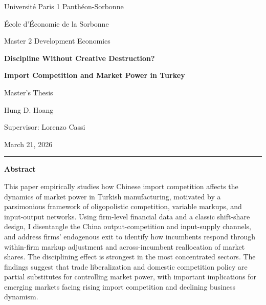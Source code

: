 \documentclass[12pt]{article}
\begin{document}
\begin{titlepage}
\thispagestyle{empty}
\begin{center}
\vspace*{0.45cm}
{\large Universit\'{e} Paris 1 Panth\'{e}on-Sorbonne\par}
\vspace{0.08cm}
{\normalsize \'{E}cole d'\'{E}conomie de la Sorbonne\par}
\vspace{0.08cm}
{\normalsize Master 2 Development Economics\par}

\vspace{0.95cm}

{\Large\bfseries Discipline Without Creative Destruction?\par}
\vspace{0.18cm}
{\large\bfseries Import Competition and Market Power in Turkey\par}

\vspace{0.85cm}

{\normalsize Master's Thesis\par}
\vspace{0.32cm}
{\large Hung D. Hoang\par}

\vspace{0.2cm}

{\normalsize Supervisor: Lorenzo Cassi\par}

\vspace{0.38cm}

{\normalsize March 21, 2026\par}
\end{center}

\vspace{0.45cm}
\noindent\rule{\textwidth}{0.5pt}

\begingroup
{}
\footnotesize
\begin{center}
\begin{minipage}{0.94\textwidth}
\textbf{Abstract}

\smallskip

This paper empirically studies how Chinese import competition affects the dynamics of market power in Turkish manufacturing, motivated by a parsimonious framework of oligopolistic competition, variable markups, and input-output networks. Using firm-level financial data and a classic shift-share design, I disentangle the China output-competition and input-supply channels, and address firms' endogenous exit to identify how incumbents respond through within-firm markup adjustment and across-incumbent reallocation of market shares. The disciplining effect is strongest in the most concentrated sectors. The findings suggest that trade liberalization and domestic competition policy are partial substitutes for controlling market power, with important implications for emerging markets facing rising import competition and declining business dynamism.


\end{minipage}
\end{center}
\end{titlepage}
\end{document}
